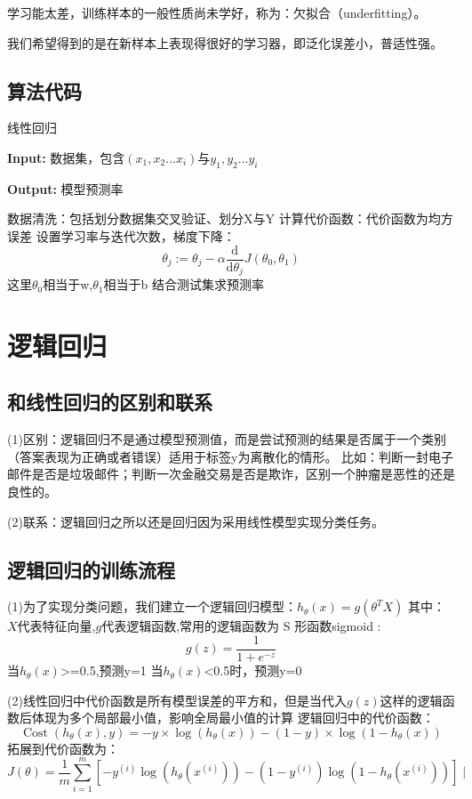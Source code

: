 \documentclass[supercite]{Experimental_Report}
\theoremstyle{definition}
\begin{document}
学习能太差，训练样本的一般性质尚未学好，称为：欠拟合（underfitting）。

我们希望得到的是在新样本上表现得很好的学习器，即泛化误差小，普适性强。
\subsection{算法代码}

\begin{algorithm}[htb]
\caption{线性回归}
\label{alg:F4}
\hspace*{0.02in} {\bf Input:}
数据集，包含$(x_1,x_2...x_i)$与$y_1,y_2...y_i$

\hspace*{0.02in} {\bf Output:} 模型预测率
  \begin{algorithmic}[1]
    \State
        数据清洗：包括划分数据集交叉验证、划分X与Y
    \State
        计算代价函数：代价函数为均方误差
    \State
        设置学习率与迭代次数，梯度下降：
        $$ \theta_j:= \theta_j-α\frac{\mathrm{d}}{\mathrm{d}\theta_j}J(\theta_0,\theta_1) 
        $$这里$\theta_0$相当于w,$\theta_1$相当于b
    \State
        结合测试集求预测率
  \end{algorithmic}
\end{algorithm}
\clearpage

\section{逻辑回归}
\subsection{和线性回归的区别和联系}
(1)区别：逻辑回归不是通过模型预测值，而是尝试预测的结果是否属于一个类别（答案表现为正确或者错误）适用于标签y为离散化的情形。
比如：判断一封电子邮件是否是垃圾邮件；判断一次金融交易是否是欺诈，区别一个肿瘤是恶性的还是良性的。

(2)联系：逻辑回归之所以还是回归因为采用线性模型实现分类任务。

\subsection{逻辑回归的训练流程}
(1)为了实现分类问题，我们建立一个逻辑回归模型：$h_\theta(x)=g(\theta^TX)$
其中： $X$代表特征向量,$g$代表逻辑函数,常用的逻辑函数为 S 形函数sigmoid :
$$g(z)=\frac{1}{1+e^{-z}}$$
当$h_\theta(x)$>=0.5,预测y=1
当$h_\theta(x)$<0.5时，预测y=0

(2)线性回归中代价函数是所有模型误差的平方和，但是当代入$g(z)$这样的逻辑函数后体现为多个局部最小值，影响全局最小值的计算
逻辑回归中的代价函数：
$$\operatorname{Cost}\left(h_{\theta}(x), y\right)=-y \times \log \left(h_{\theta}(x)\right)-(1-y) \times \log \left(1-h_{\theta}(x)\right)
$$
拓展到代价函数为：
$$
J(\theta)=\frac{1}{m} \sum_{i=1}^{m}\left[-y^{(i)} \log \left(h_{\theta}\left(x^{(i)}\right)\right)-\left(1-y^{(i)}\right) \log \left(1-h_{\theta}\left(x^{(i)}\right)\right)\right] \mid
$$
\end{document}
